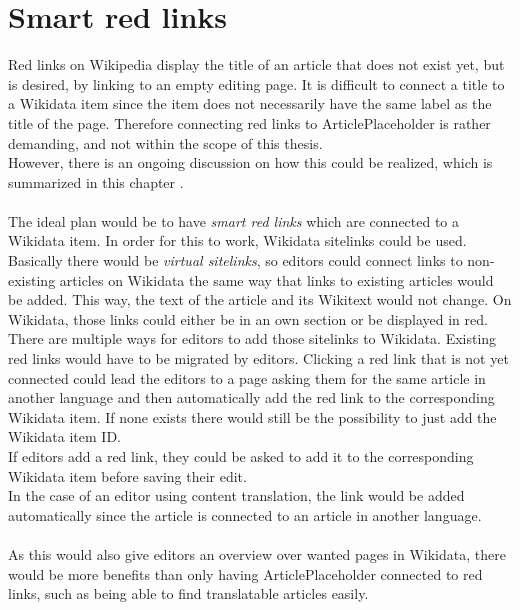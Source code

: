 \section{Smart red links}\label{sec:redLinks}
	Red links on Wikipedia display the title of an article that does not exist yet, but is desired, by linking to an empty editing page. It is difficult to connect a title to a Wikidata item since the item does not necessarily have the same label as the title of the page. Therefore connecting red links to ArticlePlaceholder is rather demanding, and not within the scope of this thesis. \\
	However, there is an ongoing discussion on how this could be realized, which is summarized in this chapter \citep{wiki:22}. \\
	\\
	The ideal plan would be to have \textit{smart red links} which are connected to a Wikidata item. In order for this to work, Wikidata sitelinks could be used. Basically there would be \textit{virtual sitelinks}, so editors could connect links to non-existing articles on Wikidata the same way that links to existing articles would be added. This way, the text of the article and its Wikitext would not change. On Wikidata, those links could either be in an own section or be displayed in red. \\
	There are multiple ways for editors to add those sitelinks to Wikidata. Existing red links would have to be migrated by editors. Clicking a red link that is not yet connected could lead the editors to a page asking them for the same article in another language and then automatically add the red link to the corresponding Wikidata item. If none exists there would still be the possibility to just add the Wikidata item ID. \\
	If editors add a red link, they could be asked to add it to the corresponding Wikidata item before saving their edit. \\
	In the case of an editor using content translation, the link would be added automatically since the article is connected to an article in another language. \\
	\\
	As this would also give editors an overview over wanted pages in Wikidata, there would be more benefits than only having ArticlePlaceholder connected to red links, such as being able to find translatable articles easily.